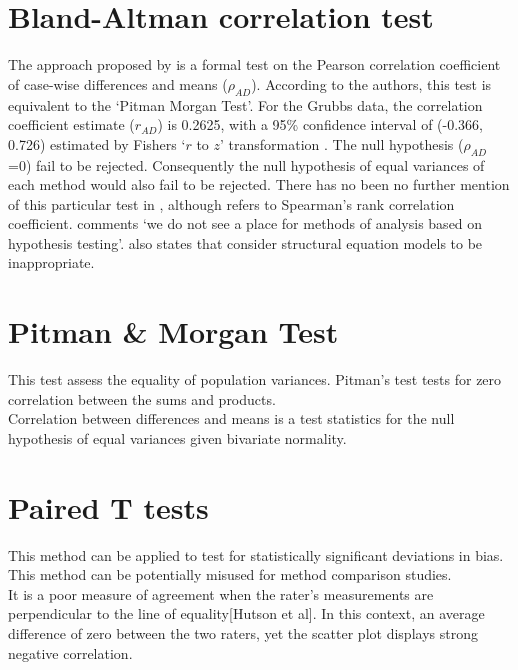 \documentclass[12pt, a4paper]{report}
\theoremstyle{plain}
\theoremstyle{definition}
\theoremstyle{remark}
\begin{document}
	
	
	\section{Bland-Altman correlation test}
	
	The approach proposed by \citet{BA83} is a formal test on the
	Pearson correlation coefficient of case-wise differences and means
	($\rho_{AD}$). According to the authors, this test is equivalent
	to the `Pitman Morgan Test'. For the Grubbs data, the correlation
	coefficient estimate ($r_{AD}$) is 0.2625, with a 95\% confidence
	interval of (-0.366, 0.726) estimated by Fishers `$r$ to $z$'
	transformation \citep*{Cohen}. The null hypothesis ($\rho_{AD}$ =0)
	fail to be rejected. Consequently the null hypothesis of equal
	variances of each method would also fail to be rejected. There has
	no been no further mention of this particular test in
	\citet{BA86}, although \citet{BA99} refers to Spearman's rank
	correlation coefficient. \citet{BA99} comments `we do not see a
	place for methods of analysis based on hypothesis testing'.
	\citet{BA99} also states that consider structural equation models
	to be inappropriate.



	\section{Pitman \& Morgan Test} This test assess the equality
	of population variances. Pitman's test tests for zero correlation
	between the sums and products.
	\\
	Correlation between differences and means is a test statistics for
	the null hypothesis of equal variances given bivariate normality.
	

	\newpage
	



			\section{Paired T tests} This method can be applied to test for
			statistically significant deviations in bias. This method can be
			potentially misused for method comparison studies.
			\\It is a poor measure of agreement when the rater's measurements
			are perpendicular to the line of equality[Hutson et al]. In this
			context, an average difference of zero between the two raters, yet
			the scatter plot displays strong negative correlation.
			
\end{document}
